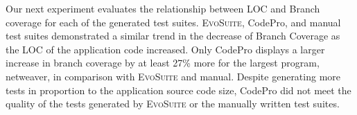 
Our next experiment evaluates the relationship between LOC and Branch coverage for each of the generated test suites.  \textsc{EvoSuite}, CodePro, and manual test suites demonstrated a similar trend in the decrease of Branch Coverage as the LOC of the application code increased. Only CodePro displays a larger increase in branch coverage by at least 27\%  more for the largest program, netweaver, in comparison with  \textsc{EvoSuite} and manual. Despite generating more tests in proportion to the application source code size,  CodePro did not meet the quality of the tests generated by \textsc{EvoSuite} or the manually written test suites.

